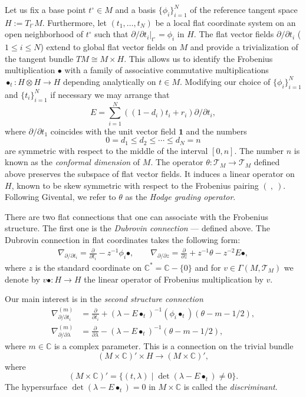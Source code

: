 \documentclass[10pt,a4paper]{article}
\numberwithin{equation}{section}
\newcommand{\CC}{\mathbb{C}}
\newcommand{\T}{\mathcal{T}}
\begin{document}
Let us fix a base point $t^\circ\in M$ and a basis
$\{\phi_i\}_{i=1}^N$ of the reference tangent space
$H:=T_{t^\circ}M$. Furthermore, let $(t_1,\dots,t_N)$ be a local flat
coordinate system on an open neighborhood of $t^\circ$ such that
$\partial/\partial t_i|_{t^\circ}=\phi_i$ in
$H$. The flat vector fields $\partial/\partial t_i$
($1\leq i\leq N$)
extend to global flat vector fields on $M$ and provide a
trivialization of the tangent bundle $TM\cong M\times H$. This allows us to
identify the Frobenius multiplication $\bullet$ with a family of
associative commutative multiplications~$\bullet_t\colon H\otimes H\to H$
depending analytically on $t\in M$. Modifying our choice of
$\{\phi_i\}_{i=1}^N$ and $\{t_i\}_{i=1}^N$ if necessary we may arrange
that
\[
E=\sum_{i=1}^N ((1-d_i) t_i + r_i)\partial/\partial t_i,
\]
where $\partial/\partial t_1$ coincides with the unit vector field
$\mathbf{1}$ and the numbers
\[
0=d_1\leq d_2\leq \cdots \leq d_N=n
\]
are symmetric with respect to the middle of the interval $[0,n]$. The
number $n$ is known as the {\em conformal dimension} of $M$. The
operator $\theta\colon \T_M\to \T_M$ defined above preserves the subspace of
flat vector fields. It induces a linear
operator on $H$, known to be skew symmetric with respect to
the Frobenius pairing $(\ ,\ )$. Following Givental, we refer to
$\theta$ as the {\em Hodge grading operator}.

There are two flat connections that one can associate with the
Frobenius structure. The first one is the {\em Dubrovin
 connection} --- defined above. The Dubrovin connection in flat
coordinates takes the following form:
\begin{gather*}
\nabla_{\partial/\partial t_i} = \frac{\partial}{\partial t_i} -
z^{-1} \phi_i\bullet, \qquad
\nabla_{\partial/\partial z} = \frac{\partial}{\partial z} +z^{-1}
\theta -z^{-2} E\bullet,
\end{gather*}
where $z$ is the standard coordinate on $\CC^*=\CC-\{0\}$ and
for $v\in \Gamma(M,\T_M)$ we denote by $v\bullet\colon H\to H$ the linear
operator of Frobenius multiplication by $v$.

Our main interest is in the {\em second structure connection }
\begin{align}
 \label{2nd_str_conn:1}
\nabla^{(m)}_{\partial/\partial t_i} & =
\frac{\partial}{\partial t_i} + (\lambda-E\bullet_t)^{-1} (\phi_i
 \bullet_t) (\theta-m-1/2),
 \\
 \label{2nd_str_conn:2}
\nabla^{(m)}_{\partial/\partial\lambda} & =
\frac{\partial}{\partial \lambda}-(\lambda-E\bullet_t)^{-1}
 (\theta-m-1/2),
\end{align}
where $m\in \CC$ is a complex parameter.
This is a connection on the trivial bundle
\[
(M\times \CC)'\times H \to (M\times \CC)',
\]
where
\[
(M\times \CC)'=\{ (t,\lambda)\mid  \det (\lambda-E\bullet_t)\neq 0\}.
\]
The hypersurface $\det (\lambda-E\bullet_t)=0$ in $M\times \CC$ is
called the {\em discriminant}.
\end{document}
